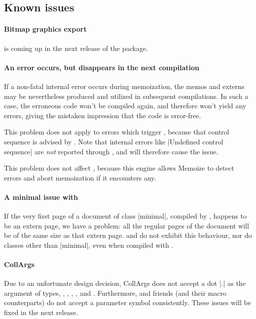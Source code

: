 \documentclass[a4paper,11pt]{article}
\begin{document}
\subsectionclearpagefalse

\subsection{Known issues}
\label{sec:known-issues}

\paragraph*{Bitmap graphics export} is coming up in the next release of the
package.


\paragraph{An error occurs, but disappears in the next compilation}
If a non-fatal internal  error occurs during memoization, the memos
and externs may be nevertheless produced and utilized in subsequent
compilations.  In such a case, the erroneous code won't be compiled again, and
therefore won't yield any errors, giving the mistaken impression that the code
is error-free.

This problem does not apply to errors which trigger ,
because that control sequence is advised by .
Note that internal  errors like |Undefined control sequence| are
\emph{not} reported through , and will therefore cause the
issue.

This problem does not affect , because this engine allows
Memoize to detect errors and abort memoization if it encounters any.


\paragraph{A minimal issue with }
If the very first page of a document of class |minimal|, compiled by
, happens to be an extern page, we have a problem: all the
regular pages of the document will be of the same size as that extern page.
 and  do not exhibit this behaviour, nor do
 classes other than |minimal|, even when compiled with
.


\paragraph{CollArgs}

Due to an unfortunate design decision, CollArgs does not accept a dot |.| as
the  argument of types, , ,
, , and .  Furthermore,
 and friends (and their macro counterparts) do not
accept a parameter symbol consistently.  These issues will be fixed in the next
release.
\end{document}
